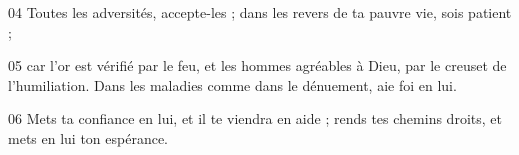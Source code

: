 
04 Toutes les adversités, accepte-les ; dans les revers de ta pauvre vie, sois patient ;

05 car l’or est vérifié par le feu, et les hommes agréables à Dieu, par le creuset de l’humiliation. Dans les maladies comme dans le dénuement, aie foi en lui.

06 Mets ta confiance en lui, et il te viendra en aide ; rends tes chemins droits, et mets en lui ton espérance.
